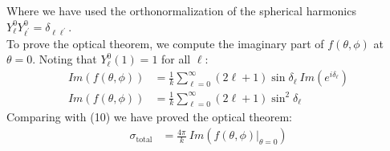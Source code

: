 \documentclass[a4paper,11pt]{article}
\numberwithin{equation}{section}
\begin{document}
Where we have used the orthonormalization of the spherical harmonics $Y_\ell^0Y_{\ell^\prime}^0=\delta_{\ell\ell^\prime} $.\\
To prove the optical theorem, we compute the imaginary part of $f(\theta,\phi)$ at $\theta=0$.
Noting that $Y_\ell^0(1)=1$ for all $\ell$:
\begin{align}
 Im\left(f(\theta,\phi)\right) &= \frac{1}{k}\sum_{\ell=0}^\infty (2\ell+1)\sin{\delta_\ell}\ Im\left(e^{i\delta_\ell}\right)\\
 Im\left(f(\theta,\phi)\right) &= \frac{1}{k}\sum_{\ell=0}^\infty (2\ell+1)\sin^2{\delta_\ell}
\end{align}
Comparing with (10) we have proved the optical theorem:
\begin{align}
 \sigma_{\text{total}} &= \frac{4\pi}{k}\ Im\left(f(\theta,\phi)|_{\theta=0} \right)
\end{align}
\end{document}
